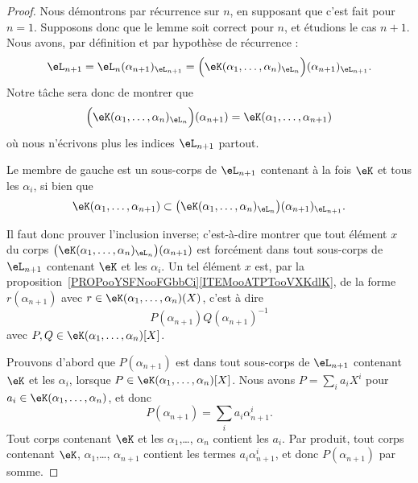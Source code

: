 \begin{proof}
    Nous démontrons par récurrence sur \( n\), en supposant que c'est fait pour \( n=1\). Supposons donc que le lemme soit correct pour \( n\), et étudions le cas \( n+1\). Nous avons, par définition et par hypothèse de récurrence :
    \begin{equation}
        \eL_{n+1}=\eL_n(\alpha_{n+1})_{\eL_{n+1}}=\Big( \eK(\alpha_1,\ldots, \alpha_n)_{\eL_n} \Big)(\alpha_{n+1})_{\eL_{n+1}}.
    \end{equation}
    Notre tâche sera donc de montrer que
    \begin{equation}\label{EQooIHMGooTlPcsd}
        \Big( \eK(\alpha_1,\ldots, \alpha_n)_{\eL_n} \Big)(\alpha_{n+1})=\eK(\alpha_1,\ldots,\alpha_{n+1})
    \end{equation}
    où nous n'écrivons plus les indices \( \eL_{n+1}\) partout.

    Le membre de gauche est un sous-corps de \( \eL_{n+1}\) contenant à la fois \( \eK \) et tous les \(\alpha_i \), si bien que
    \begin{equation}\label{EQooLLRHooHOjLfk}
        \eK(\alpha_1,\ldots,\alpha_{n+1})\subset \big( \eK(\alpha_1,\ldots, \alpha_n)_{\eL_n} \big)(\alpha_{n+1})_{\eL_{n+1}}.
    \end{equation}

    Il faut donc prouver l'inclusion inverse; c'est-à-dire montrer que tout élément \( x \) du corps \( \big( \eK(\alpha_1,\ldots, \alpha_n)_{\eL_n} \big)(\alpha_{n+1})\) est forcément dans tout sous-corps de \( \eL_{n+1}\) contenant \( \eK\) et les \( \alpha_i\). Un tel élément \( x \) est, par la proposition~\ref{PROPooYSFNooFGbbCi}\ref{ITEMooATPTooVXKdlK}, de la forme \( r(\alpha_{n+1})\) avec \( r\in \eK(\alpha_1,\ldots, \alpha_{n})(X)\), c'est à dire
            \begin{equation}
                P(\alpha_{n+1})Q(\alpha_{n+1})^{-1}
            \end{equation}
            avec \( P,Q\in \eK(\alpha_1,\ldots, \alpha_n)[X]\).

        Prouvons d'abord que \( P(\alpha_{n+1})\) est dans tout sous-corps de \( \eL_{n+1}\) contenant \( \eK\) et les \( \alpha_i\), lorsque \( P\in \eK(\alpha_1,\ldots, \alpha_n)[X]\). Nous avons \( P=\sum_ia_iX^i\) pour \( a_i\in \eK(\alpha_1,\ldots, \alpha_n)\), et donc
            \begin{equation}
                P(\alpha_{n+1})=\sum_ia_i\alpha_{n+1}^i.
            \end{equation}
            Tout corps contenant \( \eK\) et les \( \alpha_1\),\ldots, \( \alpha_n\) contient les \( a_i\). Par produit, tout corps contenant \( \eK\), \( \alpha_1\),\ldots,  \( \alpha_{n+1}\) contient les termes \( a_i\alpha_{n+1}^i\), et donc \( P(\alpha_{n+1})\) par somme.


\end{proof}
